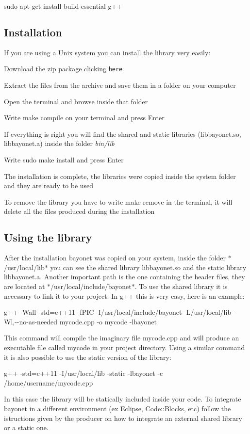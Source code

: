 {\ttfamily sudo apt-\/get install build-\/essential g++}

\subsection*{Installation }

If you are using a Unix system you can install the library very easily\-:


\begin{DoxyEnumerate}
\item Download the zip package clicking \href{https://github.com/mpatacchiola/bayonet/archive/master.zip}{\tt here}
\item Extract the files from the archive and save them in a folder on your computer
\item Open the terminal and browse inside that folder
\item Write {\ttfamily make compile} on your terminal and press Enter
\item If everything is right you will find the shared and static libraries (libbayonet.\-so, libbayonet.\-a) inside the folder {\itshape bin/lib}
\item Write {\ttfamily sudo make install} and press Enter
\item The installation is complete, the libraries were copied inside the system folder and they are ready to be used
\item To remove the library you have to write {\ttfamily make remove} in the terminal, it will delete all the files produced during the installation
\end{DoxyEnumerate}

\subsection*{Using the library }

After the installation bayonet was copied on your system, inside the folder $\ast$/usr/local/lib$\ast$ you can see the shared library libbayonet.\-so and the static library libbayonet.\-a. Another important path is the one containing the header files, they are located at $\ast$/usr/local/include/bayonet$\ast$. To use the shared library it is necessary to link it to your project. In g++ this is very easy, here is an example\-:

{\ttfamily g++ -\/\-Wall -\/std=c++11 -\/f\-P\-I\-C -\/\-I/usr/local/include/bayonet -\/\-L/usr/local/lib -\/\-Wl,-\/-\/no-\/as-\/needed mycode.\-cpp -\/o mycode -\/lbayonet}

This command will compile the imaginary file mycode.\-cpp and will produce an executable file called mycode in your project directory. Using a similar command it is also possible to use the static version of the library\-:

{\ttfamily g++ -\/std=c++11 -\/\-I/usr/local/lib -\/static -\/lbayonet -\/c /home/username/mycode.cpp}

In this case the library will be statically included inside your code. To integrate bayonet in a different environment (ex Eclipse, Code\-::\-Blocks, etc) follow the istructions given by the producer on how to integrate an external shared library or a static one. 